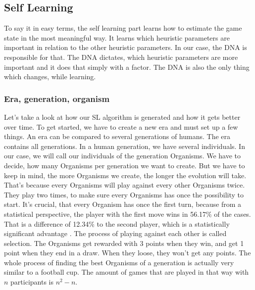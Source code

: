 
\subsection{Self Learning} \label{selflearning}
To say it in easy terms, the self learning part learns how to estimate the game state in the most meaningful way. It learns which heuristic parameters are important in relation to the other heuristic parameters. In our case, the DNA  is responsible for that. The DNA dictates, which heuristic parameters are more important and it does that simply with a factor. The \ac{DNA} is also the only thing which changes, while learning.

\subsubsection{Era, generation, organism}
Let's take a look at how our \ac{SL} algorithm is generated and how it gets better over time.
To get started, we have to create a new \ac{era} and must set up a few things. An era can be compared to several generations of humans. 
The era contains all generations. In a human generation, we have several individuals. In our case, we will call our individuals of the generation Organisms. We have to decide, how many Organisms per generation we want to create. But we have to keep in mind, the more Organisms we create, the longer the evolution will take. That's because every Organisms will play against every other Organisms twice. They play two times, to make sure every Organisms has once the possibility to start. It's crucial, that every Organism has once the first turn, because from a statistical perspective, the player with the first move wins in 56.17\% of the cases. That is a difference of 12.34\% to the second player, which is a statistically significant advantage \cite{web:tsurel2013}.
The process of playing against each other is called selection. The Organisms get rewarded with 3 points when they win, and get 1 point when they end in a draw. When they loose, they won't get any points. The whole process of finding the best Organisms of a generation is actually very similar to a football cup.
The amount of games that are played in that way with $n$ participants is $n^2-n$.\\

